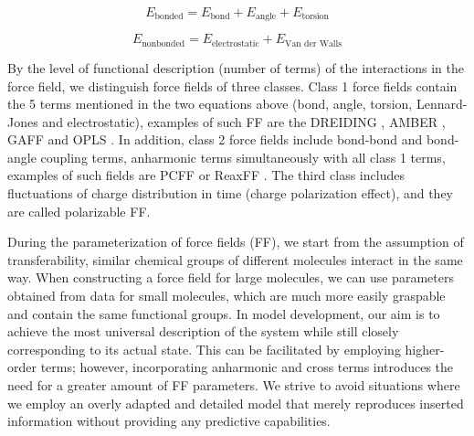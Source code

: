 \begin{equation}\label{eq:ff2}
	E_{\text{bonded}} = E_{\text{bond}} + E_{\text{angle}} + E_{\text{torsion}}
\end{equation}

\begin{equation}\label{eq:ff3}
	E_{\text{nonbonded}} = E_{\text{electrostatic}} + E_{\text{Van der Walls}}
\end{equation}

%
\newpage
By the level of functional description (number of terms) of the interactions in the force field, we distinguish force fields of three classes. Class 1 force fields contain the 5 terms mentioned in the two equations above (bond, angle, torsion, Lennard-Jones and electrostatic), examples of such FF are the DREIDING \cite{mayo_dreiding_1990}, AMBER \cite{brooks_charmm_2009}, GAFF \cite{wang_development_2004} and OPLS \cite{jorgensen_opls_1988}. In addition, class 2 force fields include bond-bond and bond-angle coupling terms, anharmonic terms simultaneously with all class 1 terms, examples of such fields are PCFF \cite{sun_ab_1994} or ReaxFF \cite{senftle_reaxff_2016}.  The third class includes fluctuations of charge distribution in time (charge polarization effect), and they are called polarizable FF. \cite{vanommeslaeghe_molecular_2014}

During the parameterization of force fields (FF), we start from the assumption of transferability,  similar chemical groups of different molecules interact in the same way. When constructing a force field for large molecules, we can use parameters obtained from data for small molecules, which are much more easily graspable and contain the same functional groups. \cite{monticelli_force_2013} In model development, our aim is to achieve the most universal description of the system while still closely corresponding to its actual state. This can be facilitated by employing higher-order terms; however, incorporating anharmonic and cross terms introduces the need for a greater amount of FF parameters. We strive to avoid situations where we employ an overly adapted and detailed model that merely reproduces inserted information without providing any predictive capabilities. \cite{vanommeslaeghe_molecular_2014}

